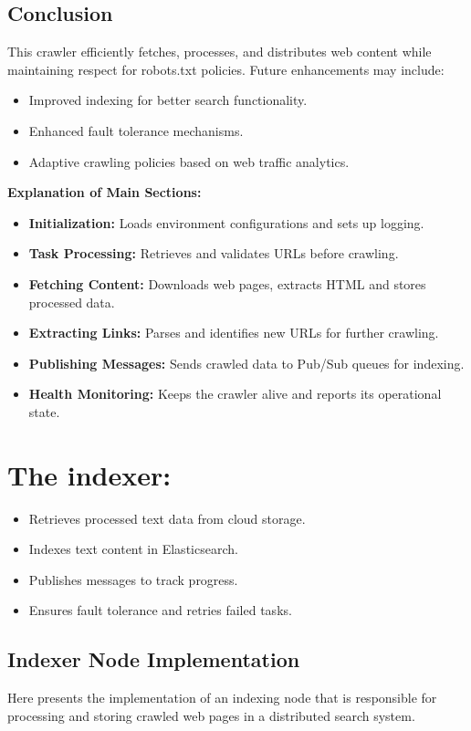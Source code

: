 \documentclass[12pt,a4paper]{report}
\begin{document}
\subsection{Conclusion}
This crawler efficiently fetches, processes, and distributes web content while maintaining respect for robots.txt policies. Future enhancements may include:
\begin{itemize}
\item Improved indexing for better search functionality.
\item Enhanced fault tolerance mechanisms.
\item Adaptive crawling policies based on web traffic analytics.
\end{itemize}


\textbf{Explanation of Main Sections:}
\begin{itemize}
\item \textbf{Initialization:} Loads environment configurations and sets up logging.
\item \textbf{Task Processing:} Retrieves and validates URLs before crawling.
\item \textbf{Fetching Content:} Downloads web pages, extracts HTML and stores processed data.
\item \textbf{Extracting Links:} Parses and identifies new URLs for further crawling.
\item \textbf{Publishing Messages:} Sends crawled data to Pub/Sub queues for indexing.
\item \textbf{Health Monitoring:} Keeps the crawler alive and reports its operational state.
\end{itemize}
\newpage
\section{The indexer:}
\begin{itemize}
\item Retrieves processed text data from cloud storage.
\item Indexes text content in Elasticsearch.
\item Publishes messages to track progress.
\item Ensures fault tolerance and retries failed tasks.
\end{itemize}

\subsection{Indexer Node Implementation}
Here presents the implementation of an indexing node that is responsible for processing and storing crawled web pages in a distributed search system.
\end{document}
